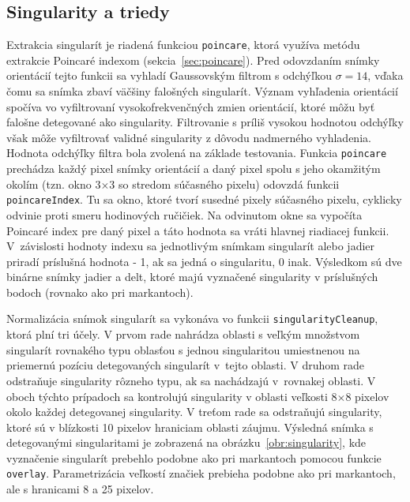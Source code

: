   \subsection{Singularity a triedy} \label{sec:singul_a_triedy}
  Extrakcia singularít je riadená funkciou \texttt{poincare}, ktorá využíva metódu extrakcie Poincaré indexom (sekcia~{\ref{sec:poincare}}). Pred odovzdaním
  snímky orientácií tejto funkcii sa vyhladí Gaussovským filtrom s odchýľkou $\sigma = 14$, vďaka čomu sa snímka zbaví väčšiny falošných singularít.
  Význam vyhľadenia orientácií spočíva vo vyfiltrovaní vysokofrekvenčných zmien orientácií, ktoré môžu byť falošne detegované ako singularity. Filtrovanie
  s príliš vysokou hodnotou odchýľky však môže vyfiltrovať validné singularity z dôvodu nadmerného vyhladenia. Hodnota odchýľky filtra bola zvolená na
  základe testovania.
  Funkcia \texttt{poincare} prechádza každý pixel snímky orientácií
  a daný pixel spolu s jeho okamžitým okolím (tzn. okno $3$$\times{}$$3$ so stredom súčasného pixelu) odovzdá funkcii \texttt{poincareIndex}. Tu sa okno,
  ktoré tvorí susedné pixely súčasného pixelu, cyklicky odvinie
  proti smeru hodinových ručičiek. Na odvinutom okne sa vypočíta Poincaré index pre daný pixel a táto hodnota sa vráti hlavnej riadiacej funkcii.
  V~závislosti hodnoty indexu sa jednotlivým snímkam singularít alebo jadier priradí príslušná hodnota - 1, ak sa jedná o singularitu, 0 inak.
  Výsledkom sú dve binárne snímky jadier a delt, ktoré majú vyznačené singularity v príslušných bodoch (rovnako ako pri markantoch).
  
  Normalizácia snímok singularít sa vykonáva vo funkcii \texttt{singularityCleanup}, ktorá plní tri účely. V prvom rade nahrádza oblasti s veľkým
  množstvom singularít rovnakého typu oblasťou s jednou singularitou umiestnenou na priemernú pozíciu detegovaných singularít v~tejto oblasti.
  V druhom rade odstraňuje singularity rôzneho typu, ak sa nachádzajú v~rovnakej oblasti. V oboch týchto
  prípadoch sa kontrolujú singularity v oblasti veľkosti $8$$\times{}$$8$ pixelov okolo každej detegovanej singularity. V treťom rade sa odstraňujú singularity,
  ktoré sú v blízkosti 10 pixelov hraniciam oblasti záujmu. Výsledná snímka s detegovanými singularitami je zobrazená na
  obrázku~{\ref{obr:singularity}}, kde vyznačenie singularít prebehlo podobne ako pri markantoch pomocou funkcie \texttt{overlay}. Parametrizácia veľkostí
  značiek prebieha podobne ako pri markantoch, ale s hranicami 8 a 25 pixelov.

